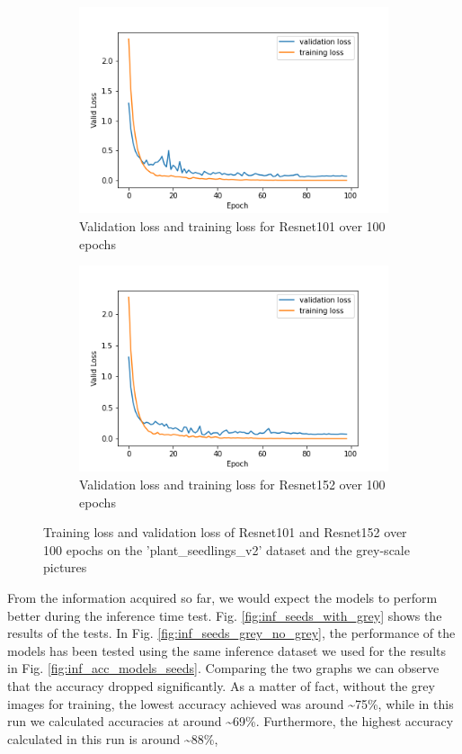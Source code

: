     
\begin{figure}[h]
\begin{subfigure}{0.5\textwidth}
     \centering
	    \includegraphics[width = \gws cm]{epoch_valid_loss_resnet101_2.png}
\caption{Validation loss and training loss for Resnet101 over 100 epochs}\label{fig:epoch_valid_loss_resnet101_2}
     \end{subfigure}
\begin{subfigure}{0.5\textwidth}
     \centering
	    \includegraphics[width = \gws cm]{epoch_valid_loss_resnet152_2.png}
\caption{Validation loss and training loss for Resnet152 over 100 epochs}\label{fig:epoch_valid_loss_resnet152_2}
     \end{subfigure}  
     \caption{Training loss and validation loss of Resnet101 and Resnet152 over 100 epochs on the  'plant\_seedlings\_v2' dataset and the grey-scale pictures}
        \label{fig:tran_valid_loss_seeds_res_100_2}
\end{figure}
From the information acquired so far, we would expect the models to perform better during the inference time test. Fig. \ref{fig:inf_seeds_with_grey} shows the results of the tests. In Fig. \ref{fig:inf_seeds_grey_no_grey}, the performance of the models has been tested using the same inference dataset we used for the results in Fig. \ref{fig:inf_acc_models_seeds}. Comparing the two graphs we can observe that the accuracy dropped significantly. As a matter of fact, without the grey images for training, the lowest accuracy achieved was around \textasciitilde75\%, while in this run we calculated accuracies at around \textasciitilde69\%. Furthermore, the highest accuracy calculated in this run is around \textasciitilde88\%,
